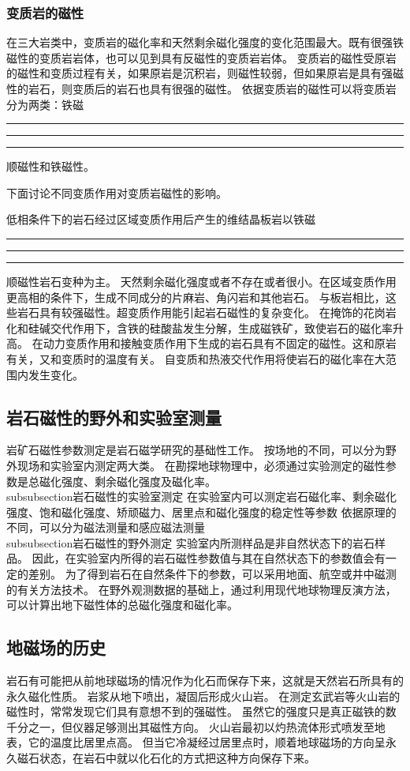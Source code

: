 \documentclass[hyperref,UTF-8,twoside]{ctexart}
\newcommand{\cndash}{\rule{0.2em}{0pt}\rule[0.35em]{1.6em}{0.05em}\rule{0.2em}{0pt}}%
\begin{document}
\subsubsection{变质岩的磁性}
在三大岩类中，变质岩的磁化率和天然剩余磁化强度的变化范围最大。既有很强铁磁性的变质岩岩体，也可以见到具有反磁性的变质岩岩体。
变质岩的磁性受原岩的磁性和变质过程有关，如果原岩是沉积岩，则磁性较弱，但如果原岩是具有强磁性的岩石，则变质后的岩石也具有很强的磁性。
依据变质岩的磁性可以将变质岩分为两类：铁磁\cndash{}顺磁性和铁磁性。

下面讨论不同变质作用对变质岩磁性的影响。

低相条件下的岩石经过区域变质作用后产生的维结晶板岩以铁磁\cndash{}顺磁性岩石变种为主。
天然剩余磁化强度或者不存在或者很小。在区域变质作用更高相的条件下，生成不同成分的片麻岩、角闪岩和其他岩石。
与板岩相比，这些岩石具有较强磁性。超变质作用能引起岩石磁性的复杂变化。
在掩饰的花岗岩化和硅碱交代作用下，含铁的硅酸盐发生分解，生成磁铁矿，致使岩石的磁化率升高。
在动力变质作用和接触变质作用下生成的岩石具有不固定的磁性。这和原岩有关，又和变质时的温度有关。
自变质和热液交代作用将使岩石的磁化率在大范围内发生变化。
\subsection{岩石磁性的野外和实验室测量}
岩矿石磁性参数测定是岩石磁学研究的基础性工作。
按场地的不同，可以分为野外现场和实验室内测定两大类。
在勘探地球物理中，必须通过实验测定的磁性参数是总磁化强度、剩余磁化强度及磁化率。
\\subsubsection{岩石磁性的实验室测定}
在实验室内可以测定岩石磁化率、剩余磁化强度、饱和磁化强度、矫顽磁力、居里点和磁化强度的稳定性等参数
依据原理的不同，可以分为磁法测量和感应磁法测量
\\subsubsection{岩石磁性的野外测定}
实验室内所测样品是非自然状态下的岩石样品。
因此，在实验室内所得的岩石磁性参数值与其在自然状态下的参数值会有一定的差别。
为了得到岩石在自然条件下的参数，可以采用地面、航空或井中磁测的有关方法技术。
在野外观测数据的基础上，通过利用现代地球物理反演方法，可以计算出地下磁性体的总磁化强度和磁化率。
\subsection{地磁场的历史}
岩石有可能把从前地球磁场的情况作为化石而保存下来，这就是天然岩石所具有的永久磁化性质。
岩浆从地下喷出，凝固后形成火山岩。
在测定玄武岩等火山岩的磁性时，常常发现它们具有意想不到的强磁性。
虽然它的强度只是真正磁铁的数千分之一，但仪器足够测出其磁性方向。
火山岩最初以灼热流体形式喷发至地表，它的温度比居里点高。
但当它冷凝经过居里点时，顺着地球磁场的方向呈永久磁石状态，在岩石中就以化石化的方式把这种方向保存下来。
\end{document}
